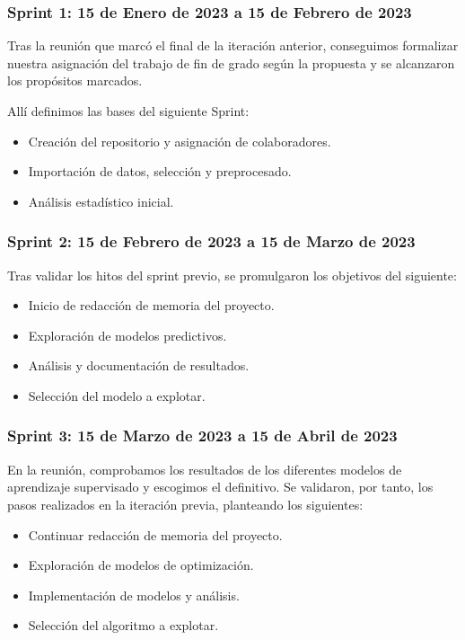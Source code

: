 \subsubsection{Sprint 1: 15 de Enero de 2023 a 15 de Febrero de 2023}

Tras la reunión que marcó el final de la iteración anterior, conseguimos formalizar nuestra asignación del trabajo de fin de grado según la propuesta y se alcanzaron los propósitos marcados.

Allí definimos las bases del siguiente Sprint:

\begin{itemize}
    \item Creación del repositorio y asignación de colaboradores.
    \item Importación de datos, selección y preprocesado.
    \item Análisis estadístico inicial.
\end{itemize}

\subsubsection{Sprint 2: 15 de Febrero de 2023 a 15 de Marzo de 2023}

Tras validar los hitos del sprint previo, se promulgaron los objetivos del siguiente:

\begin{itemize}
    \item Inicio de redacción de memoria del proyecto.
    \item Exploración de modelos predictivos.
    \item Análisis y documentación de resultados.
    \item Selección del modelo a explotar.
\end{itemize}

\subsubsection{Sprint 3: 15 de Marzo de 2023 a 15 de Abril de 2023}

En la reunión, comprobamos los resultados de los diferentes modelos de aprendizaje supervisado y escogimos el definitivo.
Se validaron, por tanto, los pasos realizados en la iteración previa, planteando los siguientes:

\begin{itemize}
    \item Continuar redacción de memoria del proyecto.
    \item Exploración de modelos de optimización.
    \item Implementación de modelos y análisis.
    \item Selección del algoritmo a explotar.
\end{itemize}


